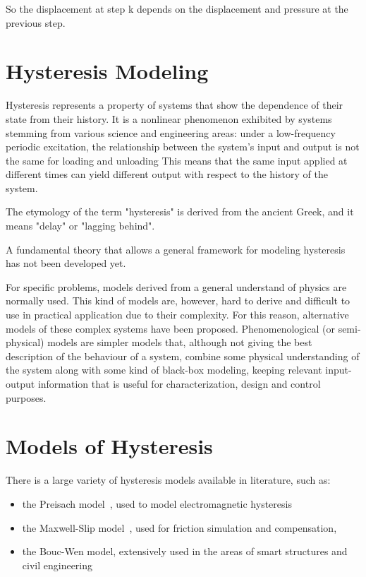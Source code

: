 So the displacement at step k depends on the displacement and pressure
at the previous step.

\section{Hysteresis Modeling}

Hysteresis represents a property of systems that show
the dependence of their state from their history.
It is a nonlinear phenomenon exhibited by systems stemming
from various science and engineering areas: under a low-frequency
periodic excitation, the relationship between the system’s input and
output is not the same for loading and unloading
This means that the same input applied at different times can yield
different output with respect to the history of the system.

The etymology of the term "hysteresis" is derived from the ancient Greek,
and it means "delay" or "lagging behind".

A fundamental theory that allows a general framework
for modeling hysteresis has not been developed yet.

For specific problems, models derived from a general understand of physics
are normally used. This kind of models are, however, hard to derive and
difficult to use in practical application due to their complexity.
For this reason, alternative models of these complex systems have been proposed.
Phenomenological (or semi-physical) models are simpler models that,
although not giving the best description of the behaviour of a system,
combine some physical understanding of the system along with
some kind of black-box modeling, keeping relevant
input-output information that is useful for characterization,
design and control purposes.


\section{Models of Hysteresis}

There is a large variety of hysteresis models available in literature,
such as:

\begin{itemize}[noitemsep]
	\item the Preisach model~\cite{preisach}, used to model electromagnetic hysteresis
	\item the Maxwell-Slip model~\cite{maxwell-slip}, used for friction simulation and compensation,
	\item the Bouc-Wen model, extensively used in the areas of smart structures
	and civil engineering~\cite{bouc_wen}
\end{itemize}

